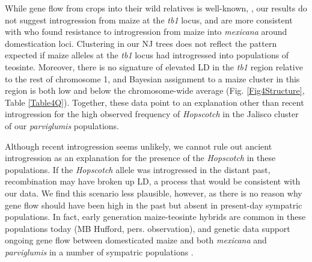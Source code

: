 \documentclass[11pt]{article} %
\begin{document}
\begin{linenumbers}
\begin{flushleft}
While gene flow from crops into their wild relatives is well-known, \citep{Ellstrand1999, Zhang2009, Thurber2010, Baack2008, Hubner2012, Wilkes1977, VanHeerwaarden2011, Barrett1983}, our results do not suggest introgression from maize at the \emph{tb1} locus, and are more consistent with \citet{Hufford2013} who found resistance to introgression from maize into \emph{mexicana} around domestication loci. 
Clustering in our NJ trees does not reflect the pattern expected if maize alleles at the \emph{tb1} locus had introgressed into populations of teosinte.  Moreover, there is no signature of elevated LD in the \emph{tb1} region relative to the rest of chromosome 1, and Bayesian assignment to a maize cluster in this region is both low and below the chromosome-wide average (Fig. \ref{Fig4Structure}, Table \ref{Table4Q}). Together, these data point to an explanation other than recent introgression for the high observed frequency of \emph{Hopscotch} in the Jalisco cluster of our \emph{parviglumis} populations.

Although recent introgression seems unlikely, we cannot rule out ancient introgression as an explanation for the presence of the \emph{Hopscotch} in these populations. If the \emph{Hopscotch} allele was introgressed in the distant past, recombination may have broken up LD, a process that would be consistent with our data.  We find this scenario less plausible, however, as there is no reason why gene flow should have been high in the past but absent in present-day sympatric populations.  In fact, early generation maize-teosinte hybrids are common in these populations today (MB Hufford, pers. observation), and genetic data support ongoing gene flow between domesticated maize and both \emph{mexicana} and \emph{parviglumis} in a number of sympatric populations \citep{Hufford2013, Ellstrand2007, VanHeerwaarden2011, Warburton2011}. 


\end{flushleft}
\end{linenumbers}
\end{document}
